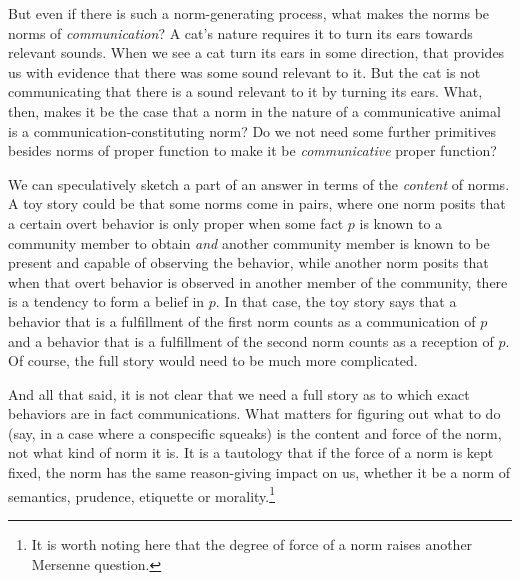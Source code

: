 But even if there is such a norm-generating process, what makes the norms be norms of \textit{communication}? A cat's nature 
requires it to turn its ears towards relevant sounds. When we see a cat turn its ears in some direction, that provides us with 
evidence that there was some sound relevant to it. But the cat is not communicating that there is a sound relevant to it by
turning its ears. What, then, makes it be the case that a norm in the nature of a communicative animal is a communication-constituting
norm? Do we not need some further primitives besides norms of proper function to make it be \textit{communicative} proper function?

We can speculatively sketch a part of an answer in terms of the \textit{content} of norms. A toy story could be that 
some norms come in pairs, where one norm posits that a certain overt behavior is only proper when some fact $p$ is known to a 
community member to obtain \textit{and} another community member is known to be present and capable of observing the behavior, while 
another 
norm posits that when that overt behavior is observed in another member of the community, there is a tendency to form a belief 
in $p$. In that case, the toy story says that a behavior that is a fulfillment of the first norm counts as a communication 
of $p$ and a behavior that is a fulfillment of the second norm counts as a reception of $p$. Of course, the full story would need
to be much more complicated.

And all that said, it is not clear that we need a full story as to which exact behaviors are in fact communications. What matters
for figuring out what to do (say, in a case where a conspecific squeaks) is the 
content and force of the norm, not what kind of norm it is. It is a tautology that if the 
force of a norm is kept fixed, the norm has the same reason-giving impact on us, whether it be a norm of semantics, prudence, 
etiquette or morality.\footnote{It is worth noting here that the degree of force
of a norm raises another Mersenne question.}


